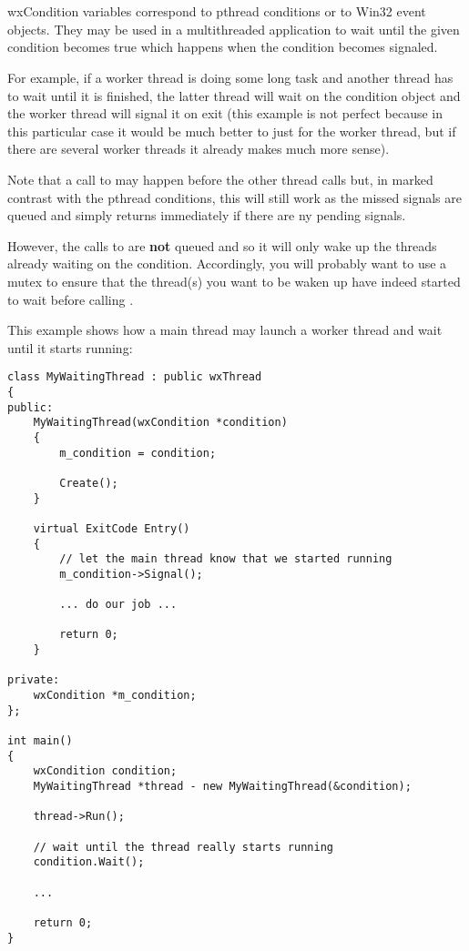 \section{}\label{wxcondition}

wxCondition variables correspond to pthread conditions or to Win32 event
objects. They may be used in a multithreaded application to wait until the
given condition becomes true which happens when the condition becomes signaled.

For example, if a worker thread is doing some long task and another thread has
to wait until it is finished, the latter thread will wait on the condition
object and the worker thread will signal it on exit (this example is not
perfect because in this particular case it would be much better to just 
 for the worker thread, but if there are several
worker threads it already makes much more sense).

Note that a call to  may happen before the
other thread calls  but, in marked contrast
with the pthread conditions, this will still work as the missed signals are
queued and  simply returns immediately if
there are ny pending signals.

However, the calls to  are {\bf not} 
queued and so it will only wake up the threads already waiting on the
condition. Accordingly, you will probably want to use a mutex to ensure that
the thread(s) you want to be waken up have indeed started to wait before
calling .


This example shows how a main thread may launch a worker thread and wait until
it starts running:

\begin{verbatim}
class MyWaitingThread : public wxThread
{
public:
    MyWaitingThread(wxCondition *condition)
    {
        m_condition = condition;

        Create();
    }

    virtual ExitCode Entry()
    {
        // let the main thread know that we started running
        m_condition->Signal();

        ... do our job ...

        return 0;
    }

private:
    wxCondition *m_condition;
};

int main()
{
    wxCondition condition;
    MyWaitingThread *thread - new MyWaitingThread(&condition);

    thread->Run();

    // wait until the thread really starts running
    condition.Wait();

    ...

    return 0;
}
\end{verbatim}


